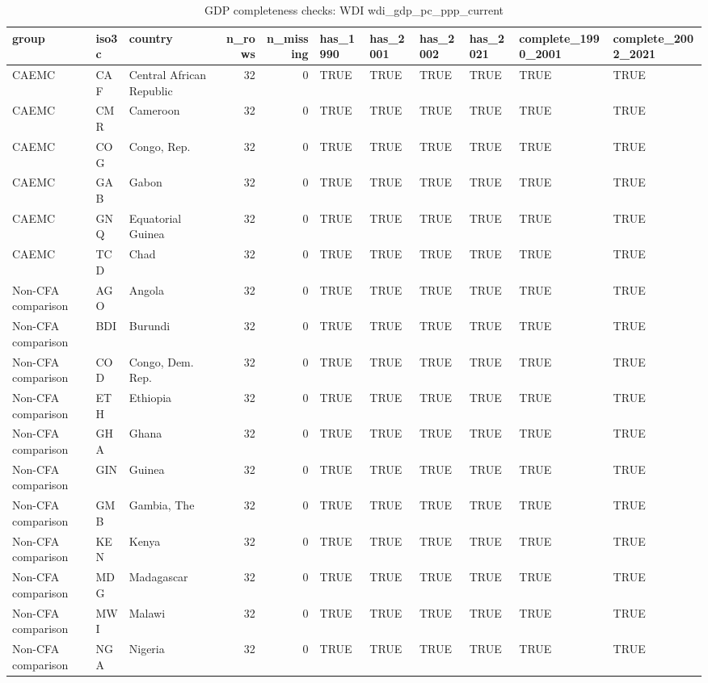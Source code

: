 \begin{table}

\caption{GDP completeness checks: WDI wdi_gdp_pc_ppp_current}
\centering
\begin{tabular}[t]{lllrrllllll}
\toprule
group & iso3c & country & n\_rows & n\_missing & has\_1990 & has\_2001 & has\_2002 & has\_2021 & complete\_1990\_2001 & complete\_2002\_2021\\
\midrule
CAEMC & CAF & Central African Republic & 32 & 0 & TRUE & TRUE & TRUE & TRUE & TRUE & TRUE\\
CAEMC & CMR & Cameroon & 32 & 0 & TRUE & TRUE & TRUE & TRUE & TRUE & TRUE\\
CAEMC & COG & Congo, Rep. & 32 & 0 & TRUE & TRUE & TRUE & TRUE & TRUE & TRUE\\
CAEMC & GAB & Gabon & 32 & 0 & TRUE & TRUE & TRUE & TRUE & TRUE & TRUE\\
CAEMC & GNQ & Equatorial Guinea & 32 & 0 & TRUE & TRUE & TRUE & TRUE & TRUE & TRUE\\
\addlinespace
CAEMC & TCD & Chad & 32 & 0 & TRUE & TRUE & TRUE & TRUE & TRUE & TRUE\\
Non-CFA comparison & AGO & Angola & 32 & 0 & TRUE & TRUE & TRUE & TRUE & TRUE & TRUE\\
Non-CFA comparison & BDI & Burundi & 32 & 0 & TRUE & TRUE & TRUE & TRUE & TRUE & TRUE\\
Non-CFA comparison & COD & Congo, Dem. Rep. & 32 & 0 & TRUE & TRUE & TRUE & TRUE & TRUE & TRUE\\
Non-CFA comparison & ETH & Ethiopia & 32 & 0 & TRUE & TRUE & TRUE & TRUE & TRUE & TRUE\\
\addlinespace
Non-CFA comparison & GHA & Ghana & 32 & 0 & TRUE & TRUE & TRUE & TRUE & TRUE & TRUE\\
Non-CFA comparison & GIN & Guinea & 32 & 0 & TRUE & TRUE & TRUE & TRUE & TRUE & TRUE\\
Non-CFA comparison & GMB & Gambia, The & 32 & 0 & TRUE & TRUE & TRUE & TRUE & TRUE & TRUE\\
Non-CFA comparison & KEN & Kenya & 32 & 0 & TRUE & TRUE & TRUE & TRUE & TRUE & TRUE\\
Non-CFA comparison & MDG & Madagascar & 32 & 0 & TRUE & TRUE & TRUE & TRUE & TRUE & TRUE\\
\addlinespace
Non-CFA comparison & MWI & Malawi & 32 & 0 & TRUE & TRUE & TRUE & TRUE & TRUE & TRUE\\
Non-CFA comparison & NGA & Nigeria & 32 & 0 & TRUE & TRUE & TRUE & TRUE & TRUE & TRUE\\

\end{tabular}
\end{table}
